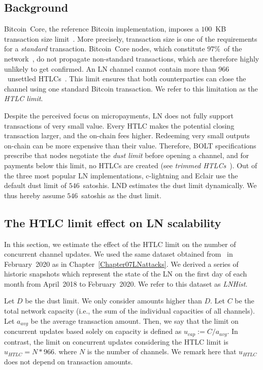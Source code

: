 \subsection{Background} \label{max-htlc-background}

Bitcoin~Core, the reference Bitcoin implementation, imposes a $100$~KB transaction size limit~\cite{StandardTxBitcoinSE, BitcoinCoreMaxTxWeight}.
More precisely, transaction size is one of the requirements for a \textit{standard} transaction.
Bitcoin~Core nodes, which constitute $97\%$~of the network~\cite{CoinDance}, do not propagate non-standard transactions, which are therefore highly unlikely to get confirmed.
An LN channel cannot contain more than $966$~unsettled HTLCs~\cite{BOLT2Rationale}.
This limit ensures that both counterparties can close the channel using one standard Bitcoin transaction.
We refer to this limitation as the \textit{HTLC limit}.

Despite the perceived focus on micropayments, LN does not fully support transactions of very small value.
Every HTLC makes the potential closing transaction larger, and the on-chain fees higher.
Redeeming very small outputs on-chain can be more expensive than their value.
Therefore, BOLT specifications prescribe that nodes negotiate the \textit{dust limit} before opening a channel, and for payments below this limit, no HTLCs are created (see \textit{trimmed HTLCs}~\cite{BOLT3Trimmed}).
Out of the three most popular LN implementations, c-lightning and Eclair use the default dust limit of $546$~satoshis.
LND estimates the dust limit dynamically.
We thus hereby assume $546$~satoshis as the dust limit.


\subsection{The HTLC limit effect on LN scalability}	\label{estimating-concurrent channel updates}

In this section, we estimate the effect of the HTLC limit on the number of concurrent channel updates.
We used the same dataset obtained from~\cite{fiatjaf2020} in February~2020 as in Chapter~\ref{Chapter07LNattacks}.
We derived a series of historic snapshots which represent the state of the LN on the first day of each month from April~2018 to February~2020.
We refer to this dataset as \textit{LNHist}.

Let $D$ be the dust limit.
We only consider amounts higher than $D$.
Let $C$ be the total network capacity (i.e., the sum of the individual capacities of all channels).
Let $a_\textit{avg}$ be the average transaction amount.
Then, we say that the limit on concurrent updates based solely on capacity is defined as $u_\textit{cap} := C / a_\textit{avg}$.
In contrast, the limit on concurrent updates considering the HTLC limit is $u_\textit{HTLC} = N * 966$.
where $N$ is the number of channels. We remark here that $u_\textit{HTLC}$ does not depend on transaction amounts.

